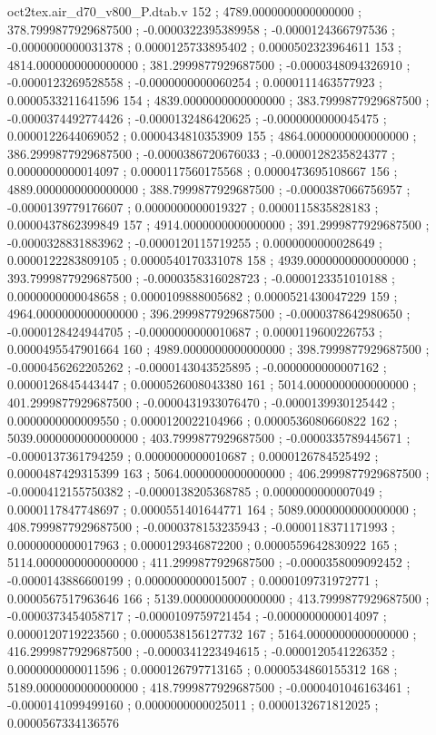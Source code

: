 \begin{filecontents}[overwrite]{oct2tex.air_d70_v800_P.dtab.v}
152 ; 4789.0000000000000000 ; 378.7999877929687500 ; -0.0000322395389958 ; -0.0000124366797536 ; -0.0000000000031378 ; 0.0000125733895402 ; 0.0000502323964611
153 ; 4814.0000000000000000 ; 381.2999877929687500 ; -0.0000348094326910 ; -0.0000123269528558 ; -0.0000000000060254 ; 0.0000111463577923 ; 0.0000533211641596
154 ; 4839.0000000000000000 ; 383.7999877929687500 ; -0.0000374492774426 ; -0.0000132486420625 ; -0.0000000000045475 ; 0.0000122644069052 ; 0.0000434810353909
155 ; 4864.0000000000000000 ; 386.2999877929687500 ; -0.0000386720676033 ; -0.0000128235824377 ; 0.0000000000014097 ; 0.0000117560175568 ; 0.0000473695108667
156 ; 4889.0000000000000000 ; 388.7999877929687500 ; -0.0000387066756957 ; -0.0000139779176607 ; 0.0000000000019327 ; 0.0000115835828183 ; 0.0000437862399849
157 ; 4914.0000000000000000 ; 391.2999877929687500 ; -0.0000328831883962 ; -0.0000120115719255 ; 0.0000000000028649 ; 0.0000122283809105 ; 0.0000540170331078
158 ; 4939.0000000000000000 ; 393.7999877929687500 ; -0.0000358316028723 ; -0.0000123351010188 ; 0.0000000000048658 ; 0.0000109888005682 ; 0.0000521430047229
159 ; 4964.0000000000000000 ; 396.2999877929687500 ; -0.0000378642980650 ; -0.0000128424944705 ; -0.0000000000010687 ; 0.0000119600226753 ; 0.0000495547901664
160 ; 4989.0000000000000000 ; 398.7999877929687500 ; -0.0000456262205262 ; -0.0000143043525895 ; -0.0000000000007162 ; 0.0000126845443447 ; 0.0000526008043380
161 ; 5014.0000000000000000 ; 401.2999877929687500 ; -0.0000431933076470 ; -0.0000139930125442 ; 0.0000000000009550 ; 0.0000120022104966 ; 0.0000536080660822
162 ; 5039.0000000000000000 ; 403.7999877929687500 ; -0.0000335789445671 ; -0.0000137361794259 ; 0.0000000000010687 ; 0.0000126784525492 ; 0.0000487429315399
163 ; 5064.0000000000000000 ; 406.2999877929687500 ; -0.0000412155750382 ; -0.0000138205368785 ; 0.0000000000007049 ; 0.0000117847748697 ; 0.0000551401644771
164 ; 5089.0000000000000000 ; 408.7999877929687500 ; -0.0000378153235943 ; -0.0000118371171993 ; 0.0000000000017963 ; 0.0000129346872200 ; 0.0000559642830922
165 ; 5114.0000000000000000 ; 411.2999877929687500 ; -0.0000358009092452 ; -0.0000143886600199 ; 0.0000000000015007 ; 0.0000109731972771 ; 0.0000567517963646
166 ; 5139.0000000000000000 ; 413.7999877929687500 ; -0.0000373454058717 ; -0.0000109759721454 ; -0.0000000000014097 ; 0.0000120719223560 ; 0.0000538156127732
167 ; 5164.0000000000000000 ; 416.2999877929687500 ; -0.0000341223494615 ; -0.0000120541226352 ; 0.0000000000011596 ; 0.0000126797713165 ; 0.0000534860155312
168 ; 5189.0000000000000000 ; 418.7999877929687500 ; -0.0000401046163461 ; -0.0000141099499160 ; 0.0000000000025011 ; 0.0000132671812025 ; 0.0000567334136576

\end{filecontents}
